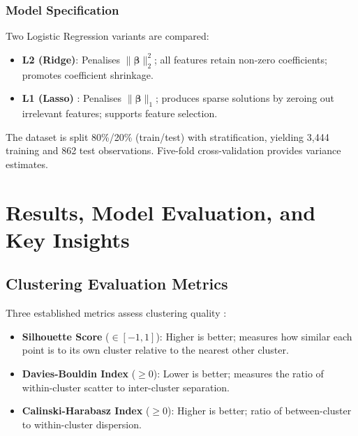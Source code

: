 \documentclass[12pt,a4paper]{article}
\begin{document}
\subsubsection{Model Specification}

Two Logistic Regression variants are compared:
\begin{itemize}[leftmargin=*]
  \item \textbf{L2 (Ridge)}: Penalises $\|\boldsymbol{\beta}\|_2^2$; all features
        retain non-zero coefficients; promotes coefficient shrinkage.
  \item \textbf{L1 (Lasso)} \parencite{tibshirani1996lasso}: Penalises
        $\|\boldsymbol{\beta}\|_1$; produces sparse solutions by zeroing out
        irrelevant features; supports feature selection.
\end{itemize}

The dataset is split 80\%/20\% (train/test) with stratification, yielding
3,444 training and 862 test observations.  Five-fold cross-validation provides
variance estimates.

\section{Results, Model Evaluation, and Key Insights}

\subsection{Clustering Evaluation Metrics}

Three established metrics assess clustering quality \parencite{rousseeuw1987silhouettes,
davies1979cluster, calinski1974dendrite}:

\begin{itemize}[leftmargin=*]
  \item \textbf{Silhouette Score} ($\in [-1, 1]$): Higher is better; measures how
        similar each point is to its own cluster relative to the nearest other cluster.
  \item \textbf{Davies-Bouldin Index} ($\geq 0$): Lower is better; measures the ratio
        of within-cluster scatter to inter-cluster separation.
  \item \textbf{Calinski-Harabasz Index} ($\geq 0$): Higher is better; ratio of
        between-cluster to within-cluster dispersion.
\end{itemize}
\end{document}
